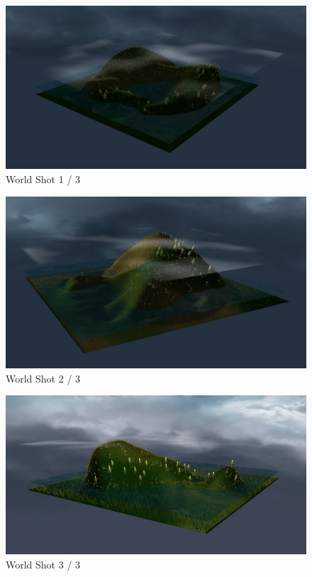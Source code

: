 \documentclass{article}
\begin{document}
    \captionsetup{justification=centering,margin=3cm}
    \begin{figure}
        \centering
        \includegraphics[width=\textwidth]{../screenshots/world1.jpg}
        \caption{World Shot 1 / 3} \label{fig:screenshot-world-1}
    \end{figure}
    \begin{figure}
        \centering
        \includegraphics[width=\textwidth]{../screenshots/world2.jpg}
        \caption{World Shot 2 / 3} \label{fig:screenshot-world-2}
    \end{figure}
    \begin{figure}
        \centering
        \includegraphics[width=\textwidth]{../screenshots/world3.jpg}
        \caption{World Shot 3 / 3} \label{fig:screenshot-world-3}
    \end{figure}
\end{document}
